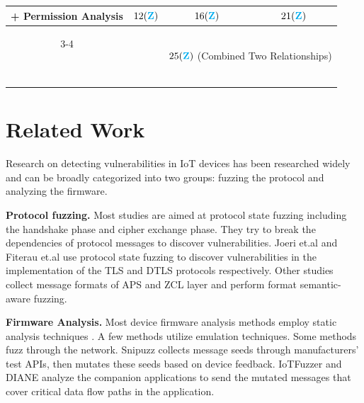 \documentclass[10pt,journal,compsoc]{IEEEtran}
\begin{document}
\begin{table}[t]
\begin{center}
{\begin{tabular}{|c|c|cc|}
            \multirow{2}{*}{\huge + Permission Analysis} &  \multirow{2}{*}{\huge $12(\textbf{{\color{Cyan}{Z}}})$} & \huge $16(\textbf{{\color{Cyan}{Z}}})$ & \huge $21(\textbf{{\color{Cyan}{Z}}})$ \\ \cline{3-4}
            
            ~ & ~  & \multicolumn{2}{c|}{\huge $25(\textbf{{\color{Cyan}{Z}}})$ (Combined Two Relationships)} \\
            
	\bottomrule
	\end{tabular}
        }
    \end{center}
    \label{table:ablation}
    \vspace{-0.5cm}
\end{table}

\section{Related Work}
Research on detecting vulnerabilities in IoT devices has been researched widely and can be broadly categorized into two groups: fuzzing the protocol and analyzing the firmware.

\textbf{Protocol fuzzing.} Most studies are aimed at protocol state fuzzing \cite{gascon2015pulsar, de2015protocol, daniel2018inferring, chen2019exploring, song2019spfuzz, fiterau2020analysis, fiteruau2022dtls, fiterau2023automata, natella2022stateafl} including the handshake phase and cipher exchange phase. They try to break the dependencies of protocol messages to discover vulnerabilities. Joeri et.al \cite{de2015protocol} and Fiterau et.al \cite{fiterau2020analysis, fiteruau2022dtls, fiterau2023automata} use protocol state fuzzing to discover vulnerabilities in the implementation of the TLS and DTLS protocols respectively. Other studies \cite{wang2022don, ma2023no, meng2024large, wang2024llmif} collect message formats of APS and ZCL layer and perform format semantic-aware fuzzing.
 
\textbf{Firmware Analysis.} Most device firmware analysis methods employ static analysis techniques \cite{ahmed2020identifying, chen2016towards, nadir2019auditing, sachidananda2020over, davidson2013fie, hernandez2017firmusb, cheng2018dtaint}. A few methods \cite{chen2016towards, kim2020firmae, zheng2019firm, zhou2022your, ren2021z} utilize emulation techniques. Some methods \cite{chen2018iotfuzzer, redini2021diane, feng2021snipuzz} fuzz through the network. Snipuzz \cite{feng2021snipuzz} collects message seeds through manufacturers' test APIs, then mutates these seeds based on device feedback. IoTFuzzer \cite{chen2018iotfuzzer} and DIANE \cite{redini2021diane} analyze the companion applications to send the mutated messages that cover critical data flow paths in the application.
\end{document}

